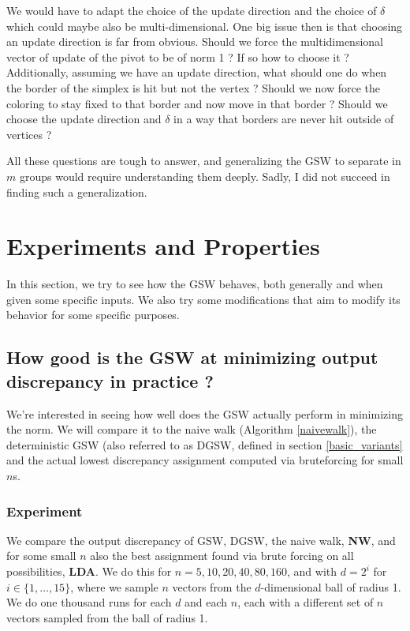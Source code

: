 \documentclass[12pt]{article}
\begin{document}
We would have to adapt the choice of the update direction and the choice of $\delta$ which could maybe also be multi-dimensional. One big issue then is that choosing an update direction is far from obvious. Should we force the multidimensional vector of update of the pivot to be of norm 1 ? If so how to choose it ? Additionally, assuming we have an update direction, what should one do when the border of the simplex is hit but not the vertex ? Should we now force the coloring to stay fixed to that border and now move in that border ? Should we choose the update direction and $\delta$ in a way that borders are never hit outside of vertices ?

All these questions are tough to answer, and generalizing the GSW to separate in $m$ groups would require understanding them deeply. Sadly, I did not succeed in finding such a generalization.

\section{Experiments and Properties}
In this section, we try to see how the GSW behaves, both generally and when given some specific inputs. We also try some modifications that aim to modify its behavior for some specific purposes.

\subsection{How good is the GSW at minimizing output discrepancy in practice ?}
We're interested in seeing how well does the GSW actually perform in minimizing the norm. We will compare it to the naive walk (Algorithm \ref{naivewalk}), the deterministic GSW (also referred to as DGSW, defined in section \ref{basic_variants} and the actual lowest discrepancy assignment computed via bruteforcing for small $n$s.

\subsubsection{Experiment}\label{how_good_at_minimizing_disc}
We compare the output discrepancy of GSW, DGSW, the naive walk, \textbf{NW}, and for some small $n$ also the best assignment found via brute forcing on all possibilities, \textbf{LDA}. We do this for $n=5,10,20,40,80,160$, and with $d=2^i$ for $i\in\{1,\dots,15\}$, where we sample $n$ vectors from the $d$-dimensional ball of radius 1. We do one thousand runs for each $d$ and each $n$, each with a different set of $n$ vectors sampled from the ball of radius 1.
\end{document}
